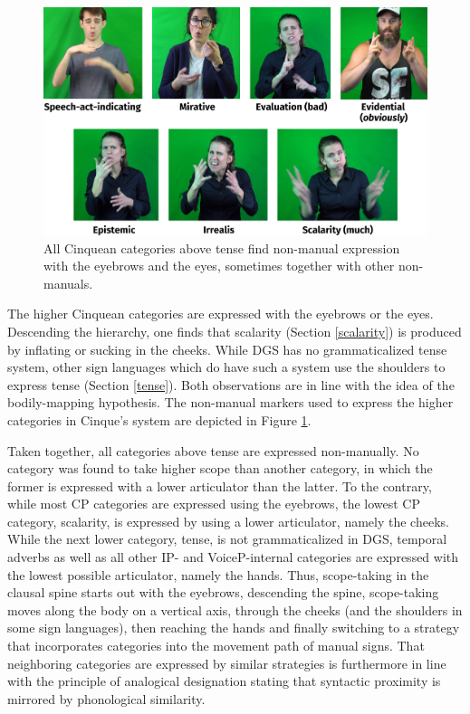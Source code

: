 \begin{figure}[bt]
\centering
	\includegraphics[width=1.0\textwidth]{uebersicht2.jpg}
	\caption{All Cinquean categories above tense find non-manual expression with the eyebrows and the eyes, sometimes together with other non-manuals.}
	\label{lowercpcategories}
\end{figure}

The higher Cinquean categories are expressed with the eyebrows or the eyes. Descending the hierarchy, one finds that scalarity (Section \ref{scalarity}) is produced by inflating or sucking in the cheeks. While DGS has no grammaticalized tense system, other sign languages which do have such a system use the shoulders to express tense (Section \ref{tense}). Both observations are in line with the idea of the bodily-mapping hypothesis. The non-manual markers used to express the higher categories in Cinque's system are depicted in Figure \ref{lowercpcategories}.

Taken together, all categories above tense are expressed non-manually. No category was found to take higher scope than another category, in which the former is expressed with a lower articulator than the latter. To the contrary, while most CP categories are expressed using the eyebrows, the lowest CP category, scalarity, is expressed by using a lower articulator, namely the cheeks. While the next lower category, tense, is not grammaticalized in DGS, temporal adverbs as well as all other IP- and VoiceP-internal categories are expressed with the lowest possible articulator, namely the hands. Thus, scope-taking in the clausal spine starts out with the eyebrows, descending the spine, scope-taking moves along the body on a vertical axis, through the cheeks (and the shoulders in some sign languages), then reaching the hands and finally switching to a strategy that incorporates categories into the movement path of manual signs. That neighboring categories are expressed by similar strategies is furthermore in line with the principle of analogical designation stating that syntactic proximity is mirrored by phonological similarity. 

